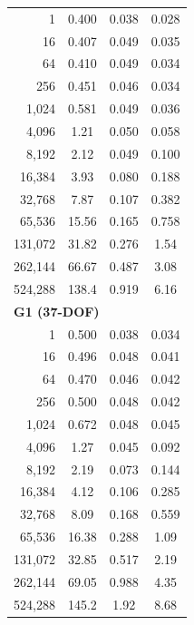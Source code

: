 \begin{table}[t]
\begin{tabular}{rccc}
1 & 0.400 & 0.038 & 0.028 \\
16 & 0.407 & 0.049 & 0.035 \\
64 & 0.410 & 0.049 & 0.034 \\
256 & 0.451 & 0.046 & 0.034 \\
1,024 & 0.581 & 0.049 & 0.036 \\
4,096 & 1.21 & 0.050 & 0.058 \\
8,192 & 2.12 & 0.049 & 0.100 \\
16,384 & 3.93 & 0.080 & 0.188 \\
32,768 & 7.87 & 0.107 & 0.382 \\
65,536 & 15.56 & 0.165 & 0.758 \\
131,072 & 31.82 & 0.276 & 1.54 \\
262,144 & 66.67 & 0.487 & 3.08 \\
524,288 & 138.4 & 0.919 & 6.16 \\
\midrule
\multicolumn{4}{l}{\textbf{G1 (37-DOF)}} \\
1 & 0.500 & 0.038 & 0.034 \\
16 & 0.496 & 0.048 & 0.041 \\
64 & 0.470 & 0.046 & 0.042 \\
256 & 0.500 & 0.048 & 0.042 \\
1,024 & 0.672 & 0.048 & 0.045 \\
4,096 & 1.27 & 0.045 & 0.092 \\
8,192 & 2.19 & 0.073 & 0.144 \\
16,384 & 4.12 & 0.106 & 0.285 \\
32,768 & 8.09 & 0.168 & 0.559 \\
65,536 & 16.38 & 0.288 & 1.09 \\
131,072 & 32.85 & 0.517 & 2.19 \\
262,144 & 69.05 & 0.988 & 4.35 \\
524,288 & 145.2 & 1.92 & 8.68 \\
\bottomrule
\end{tabular}
\end{table}